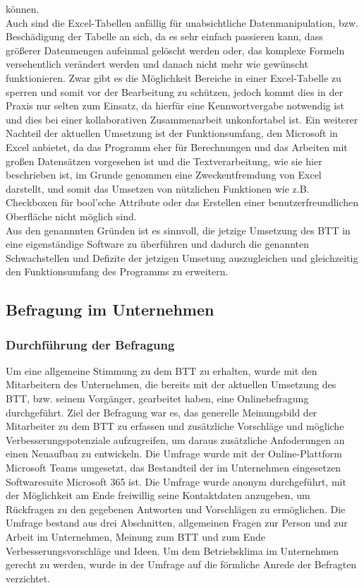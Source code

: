 können.\\Auch sind die Excel-Tabellen anfällig für unabsichtliche Datenmanipulation, bzw. Beschädigung der Tabelle an sich, da es sehr einfach passieren kann, dass größerer Datenmengen aufeinmal gelöscht werden oder, das komplexe Formeln versehentlich verändert werden und danach nicht mehr wie gewünscht funktionieren. Zwar gibt es die Möglichkeit Bereiche in einer Excel-Tabelle zu sperren und somit vor der Bearbeitung zu schützen, jedoch kommt dies in der Praxis nur selten zum Einsatz, da hierfür eine Kennwortvergabe notwendig ist und dies bei einer kollaborativen Zusammenarbeit unkonfortabel ist. Ein weiterer Nachteil der aktuellen Umsetzung ist der Funktionsumfang, den Microsoft in Excel anbietet, da das Programm eher für Berechnungen und das Arbeiten mit großen Datensätzen vorgesehen ist und die Textverarbeitung, wie sie hier beschrieben ist, im Grunde genommen eine Zweckentfremdung von Excel darstellt, und somit das Umsetzen von nützlichen Funktionen wie z.B. Checkboxen für bool'sche Attribute oder das Erstellen einer benutzerfreundlichen Oberfläche nicht möglich sind.\\ Aus den genannnten Gründen ist es sinnvoll, die jetzige Umsetzung des BTT in eine eigenständige Software zu überführen und dadurch die genannten Schwachstellen und Defizite der jetzigen Umsetung auszugleichen und gleichzeitig den Funktionsumfang des Programms zu erweitern.

\subsection{Befragung im Unternehmen}
\subsubsection{Durchführung der Befragung}
Um eine allgemeine Stimmung zu dem BTT zu erhalten, wurde mit den Mitarbeitern des Unternehmen, die bereits mit der aktuellen Umsetzung des BTT, bzw. seinem Vorgänger, gearbeitet haben, eine Onlinebefragung durchgeführt. Ziel der Befragung war es, das generelle Meinungsbild der Mitarbeiter zu dem BTT zu erfassen und zusätzliche Vorschläge und mögliche Verbesserungspotenziale aufzugreifen, um daraus zusätzliche Anfoderungen an einen Neuaufbau zu entwickeln. Die Umfrage wurde mit der Online-Plattform \glqq{}Microsoft Teams\grqq{} umgesetzt, das Bestandteil der im Unternehmen eingesetzen Softwaresuite \glqq{}Microsoft 365\grqq{} ist. Die Umfrage wurde anonym durchgeführt, mit der Möglichkeit am Ende freiwillig seine Kontaktdaten anzugeben, um Rückfragen zu den gegebenen Antworten und Vorschlägen zu ermöglichen. Die Umfrage bestand aus drei Abschnitten, allgemeinen Fragen zur Person und zur Arbeit im Unternehmen, Meinung zum BTT und zum Ende Verbesserungsvorschläge und Ideen. Um dem Betriebsklima im Unternehmen gerecht zu werden, wurde in der Umfrage auf die förmliche Anrede der Befragten verzichtet.


